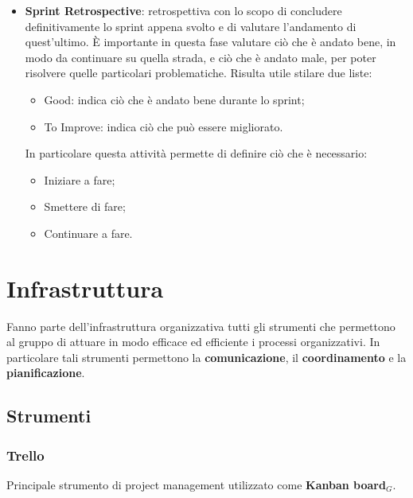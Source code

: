 \begin{itemize}
  \item \textbf{Sprint Retrospective}: retrospettiva con lo scopo di concludere definitivamente lo sprint appena svolto e di valutare l'andamento di quest'ultimo. È importante in questa fase valutare ciò che è andato bene, in modo da continuare su quella strada, e ciò che è andato male, per poter risolvere quelle particolari problematiche. Risulta utile stilare due liste:
  \begin{itemize}
    \item Good: indica ciò che è andato bene durante lo sprint;
    \item To Improve: indica ciò che può essere migliorato.
  \end{itemize}
  In particolare questa attività permette di definire ciò che è necessario:
  \begin{itemize}
    \item Iniziare a fare;
    \item Smettere di fare;
    \item Continuare a fare.
  \end{itemize}
\end{itemize}



\section{Infrastruttura}\label{sec:Infrastruttura}
Fanno parte dell'infrastruttura organizzativa tutti gli strumenti che permettono al gruppo di attuare in modo efficace ed efficiente i processi organizzativi. In particolare tali strumenti permettono la \textbf{comunicazione}, il \textbf{coordinamento} e la \textbf{pianificazione}.

\subsection{Strumenti}
\subsubsection{Trello}
Principale strumento di project management utilizzato come \textbf{Kanban board}$_G$.

